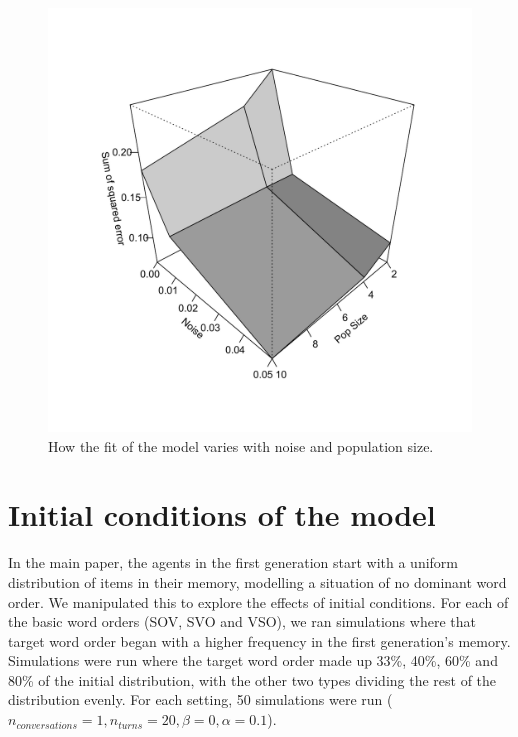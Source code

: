 \documentclass[12pt]{article}
\begin{document}
\begin{figure}[htbp]
\begin{center}
\includegraphics[width=130mm]{../images/pdf/PopSizeNoise.pdf}
\caption{How the fit of the model varies with noise and population size.}
\label{Fig:popsizenoise}
\end{center}
\end{figure}

\clearpage
\newpage

\section{Initial conditions of the model}

In the main paper, the agents in the first generation start with a uniform distribution of items in their memory, modelling a situation of no dominant word order.  We manipulated this to explore the effects of initial conditions.  For each of the basic word orders (SOV, SVO and VSO), we ran simulations where that target word order began with a higher frequency in the first generation's memory.  Simulations were run where the target word order made up 33\%, 40\%, 60\% and 80\% of  the initial distribution, with the other two types dividing the rest of the distribution evenly.  For each setting, 50 simulations were run ($n_{conversations}=1, n_{turns}=20, \beta = 0, \alpha = 0.1$).
\end{document}
